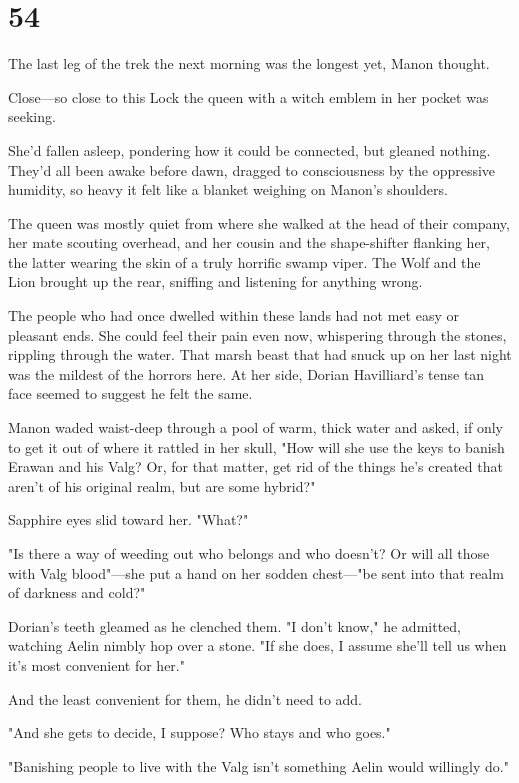 
\chapter{54}

The last leg of the trek the next morning was the longest yet, Manon thought.

Close---so close to this Lock the queen with a witch emblem in her pocket was seeking.

She'd fallen asleep, pondering how it could be connected, but gleaned nothing. They'd all been awake before dawn, dragged to consciousness by the oppressive humidity, so heavy it felt like a blanket weighing on Manon's shoulders.

The queen was mostly quiet from where she walked at the head of their company, her mate scouting overhead, and her cousin and the shape-shifter flanking her, the latter wearing the skin of a truly horrific swamp viper. The Wolf and the Lion brought up the rear, sniffing and listening for anything wrong.

The people who had once dwelled within these lands had not met easy or pleasant ends. She could feel their pain even now, whispering through the stones, rippling through the water. That marsh beast that had snuck up on her last night was the mildest of the horrors here. At her side, Dorian Havilliard's tense tan face seemed to suggest he felt the same.

Manon waded waist-deep through a pool of warm, thick water and asked, if only to get it out of where it rattled in her skull, "How will she use the keys to banish Erawan and his Valg? Or, for that matter, get rid of the things he's created that aren't of his original realm, but are some hybrid?"

Sapphire eyes slid toward her. "What?"

"Is there a way of weeding out who belongs and who doesn't? Or will all those with Valg blood"---she put a hand on her sodden chest---"be sent into that realm of darkness and cold?"

Dorian's teeth gleamed as he clenched them. "I don't know," he admitted, watching Aelin nimbly hop over a stone. "If she does, I assume she'll tell us when it's most convenient for her."

And the least convenient for them, he didn't need to add.

"And she gets to decide, I suppose? Who stays and who goes."

"Banishing people to live with the Valg isn't something Aelin would willingly do."

